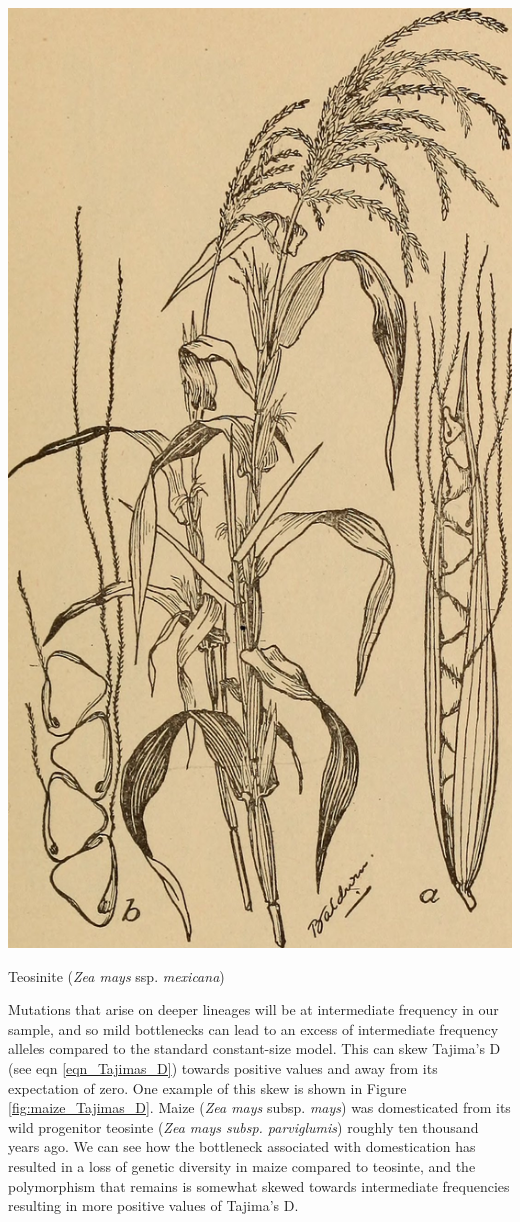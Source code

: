  \begin{marginfigure}[4cm]
 \begin{center}
   \includegraphics[width = 0.7 \textwidth]{illustration_images/Genetic_drift/teosinte/17960129408_21ad0a16f7_k.jpg}

 \end{center}
 \caption{ Teosinite ({\it Zea mays} ssp. {\it  mexicana}) } \label{fig:maize}  %
 \end{marginfigure}  %

Mutations that arise on deeper lineages will be at intermediate frequency in our sample, and so mild bottlenecks
can lead to an excess of intermediate frequency alleles compared to
the standard constant-size model. This can skew
Tajima's D (see eqn \ref{eqn_Tajimas_D}) towards positive values and away from its expectation of
zero. One example of this skew is shown in Figure
\ref{fig:maize_Tajimas_D}. Maize ({\it Zea mays} subsp. {\it mays}) was domesticated from its wild progenitor teosinte ({\it Zea mays
subsp. parviglumis}) roughly ten thousand years ago. We can see how the
 bottleneck associated with domestication has resulted in a loss of genetic diversity in maize compared to teosinte, and the polymorphism that remains is somewhat skewed towards intermediate frequencies resulting in more positive values of Tajima's D.

